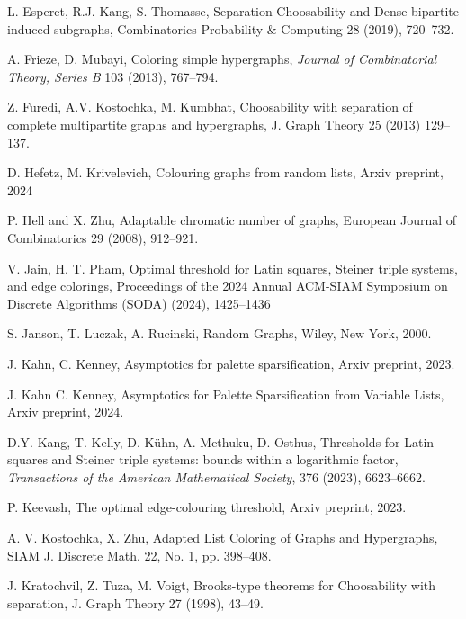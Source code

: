 \documentclass[12pt]{article}
\newcommand{\1}{\mathds{1}}
\begin{document}
\begin{thebibliography}{}
L. Esperet, R.J. Kang, S. Thomasse,
Separation Choosability and Dense bipartite induced subgraphs,
Combinatorics Probability \& Computing 28 (2019), 720--732.



A. Frieze, D. Mubayi,
Coloring simple hypergraphs,
{\em Journal of Combinatorial Theory, Series B}
103 (2013), 767--794.

Z. Furedi, A.V. Kostochka, M. Kumbhat,
Choosability with separation of complete multipartite graphs and hypergraphs,
J. Graph Theory 25 (2013) 129--137.



D. Hefetz, M. Krivelevich,
Colouring graphs from random lists, Arxiv preprint, 2024


P. Hell and X. Zhu, Adaptable chromatic number of graphs, 
European Journal of Combinatorics 29 (2008), 912--921.

V. Jain, H. T. Pham,
Optimal threshold for Latin squares, Steiner triple systems, and
edge colorings, Proceedings of the 2024 Annual ACM-SIAM Symposium on Discrete Algorithms (SODA)
(2024), 1425--1436




S. Janson, T. Luczak, A. Rucinski,
Random Graphs, Wiley, New York, 2000.

J. Kahn, C. Kenney,
Asymptotics for palette sparsification,
Arxiv preprint, 2023.

J. Kahn C. Kenney,
Asymptotics for Palette Sparsification from Variable Lists,
Arxiv preprint, 2024.

D.Y. Kang, T. Kelly, D. K\"uhn, A. Methuku,
D. Osthus,
Thresholds for Latin squares and Steiner triple
systems: bounds within a logarithmic factor,
{\em Transactions of the American Mathematical Society},
376 (2023), 6623--6662.

P. Keevash,
The optimal edge-colouring threshold,
Arxiv preprint, 2023.


A. V. Kostochka, X. Zhu, Adapted List Coloring of Graphs and Hypergraphs,
SIAM J. Discrete Math. 22, No. 1, pp. 398–408.


J. Kratochvil, Z. Tuza, M. Voigt,
Brooks-type theorems for Choosability with separation,
J. Graph Theory 27 (1998), 43--49.


\end{thebibliography}
\end{document}
